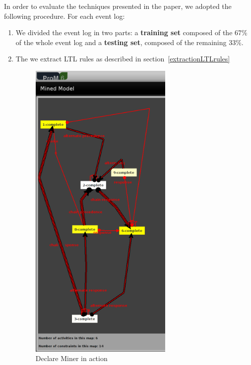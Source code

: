 In order to evaluate the techniques presented in the paper, we adopted the following procedure. For each event log:
\begin{enumerate}
\item We divided the event log in two parts: a \textbf{training set} composed of the 67\% of the whole event log and a \textbf{testing set}, composed of the remaining 33\%.
\item The we extract LTL rules as described in section~\ref{extractionLTLrules}

\begin{figure}[!ht]
	\begin{center}  
		\includegraphics[height=15cm]{3_ltl_prom.png}
		\caption{Declare Miner in action}
		\label{figure:ltl}
	\end{center}
\end{figure}



\end{enumerate}
